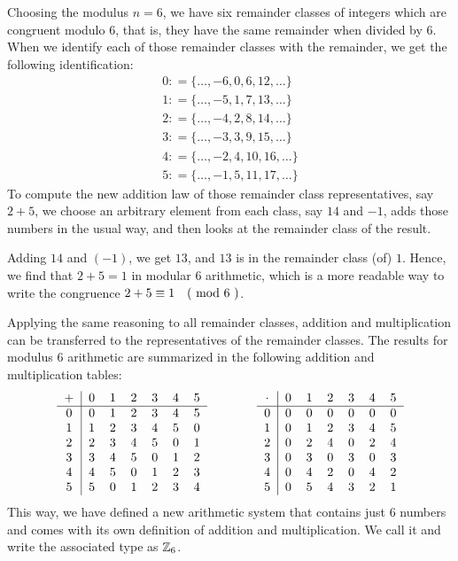 \begin{example} 
\label{def_residue_ring_z_6}
Choosing the modulus $ n = 6 $, we have six remainder classes of integers which are congruent modulo $ 6 $, that is, they have the same remainder when divided by $6$. When we identify each of those remainder classes with the remainder, we get the following identification:
$$
\begin{array}{l}
0: = \{\ldots, -6,0,6,12, \ldots \}\\
1: = \{\ldots, -5,1,7,13, \ldots \}\\
2: = \{\ldots, -4,2,8,14, \ldots \} \\
3: = \{\ldots, -3,3,9,15, \ldots \}\\
4: = \{\ldots, -2,4,10,16, \ldots \}\\
5: = \{\ldots, -1,5,11,17, \ldots \}
\end{array}
$$
To compute the new addition law of those remainder class representatives, say $2+5$, we choose an arbitrary element from each class, say $14$ and $-1$, adds those numbers in the usual way, and then looks at the remainder class of the result.

Adding $14$ and $(-1)$, we get $13$, and $13$ is in the remainder class (of) $1$. Hence, we find that $2+5=1$ in modular $6$ arithmetic, which is a more readable way to write the congruence $2+5 \equiv 1 \quad \text{( mod } 6 \text{ )}$.

Applying the same reasoning to all remainder classes, addition and multiplication can  be transferred to the representatives of the remainder classes. The results for modulus $6$ arithmetic are summarized in the following addition and multiplication tables:
\begin{equation}\label{eq:Z6_tables}
  \begin{tabular}{c | c c c c c c}
    + & 0 & 1 & 2 & 3 & 4 & 5\\\hline
    0 & 0 & 1 & 2 & 3 & 4 & 5 \\
    1 & 1 & 2 & 3 & 4 & 5 & 0\\
    2 & 2 & 3 & 4 & 5 & 0 & 1\\
    3 & 3 & 4 & 5 & 0 & 1 & 2\\
    4 & 4 & 5 & 0 & 1 & 2 & 3\\
    5 & 5 & 0 & 1 & 2 & 3 & 4
  \end{tabular} \quad \quad \quad \quad
  \begin{tabular}{c | c c c c c c}
$ \cdot $ & 0 & 1 & 2 & 3 & 4 & 5 \\\hline
        0 & 0 & 0 & 0 & 0 & 0 & 0\\
        1 & 0 & 1 & 2 & 3 & 4 & 5\\
        2 & 0 & 2 & 4 & 0 & 2 & 4\\
        3 & 0 & 3 & 0 & 3 & 0 & 3\\
        4 & 0 & 4 & 2 & 0 & 4 & 2\\
        5 & 0 & 5 & 4 & 3 & 2 & 1
  \end{tabular}
\end{equation}
This way, we have defined a new arithmetic system that contains just $6$ numbers and comes with its own definition of addition and multiplication. We call it  and write the associated type as $\mathbb{Z}_6$.


\end{example}

